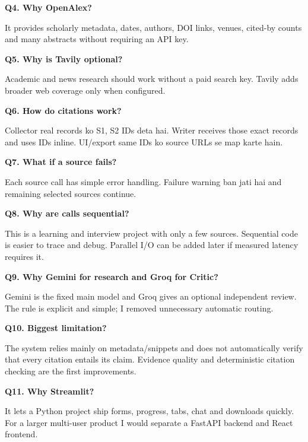 \documentclass[11pt,a4paper]{article}
\begin{document}
\textbf{Q4. Why OpenAlex?}
\begin{answerbox}
It provides scholarly metadata, dates, authors, DOI links, venues, cited-by counts and many abstracts without requiring an API key.
\end{answerbox}

\textbf{Q5. Why is Tavily optional?}
\begin{answerbox}
Academic and news research should work without a paid search key. Tavily adds broader web coverage only when configured.
\end{answerbox}

\textbf{Q6. How do citations work?}
\begin{answerbox}
Collector real records ko S1, S2 IDs deta hai. Writer receives those exact records and uses IDs inline. UI/export same IDs ko source URLs se map karte hain.
\end{answerbox}

\textbf{Q7. What if a source fails?}
\begin{answerbox}
Each source call has simple error handling. Failure warning ban jati hai and remaining selected sources continue.
\end{answerbox}

\textbf{Q8. Why are calls sequential?}
\begin{answerbox}
This is a learning and interview project with only a few sources. Sequential code is easier to trace and debug. Parallel I/O can be added later if measured latency requires it.
\end{answerbox}

\textbf{Q9. Why Gemini for research and Groq for Critic?}
\begin{answerbox}
Gemini is the fixed main model and Groq gives an optional independent review. The rule is explicit and simple; I removed unnecessary automatic routing.
\end{answerbox}

\textbf{Q10. Biggest limitation?}
\begin{answerbox}
The system relies mainly on metadata/snippets and does not automatically verify that every citation entails its claim. Evidence quality and deterministic citation checking are the first improvements.
\end{answerbox}

\textbf{Q11. Why Streamlit?}
\begin{answerbox}
It lets a Python project ship forms, progress, tabs, chat and downloads quickly. For a larger multi-user product I would separate a FastAPI backend and React frontend.
\end{answerbox}
\end{document}
